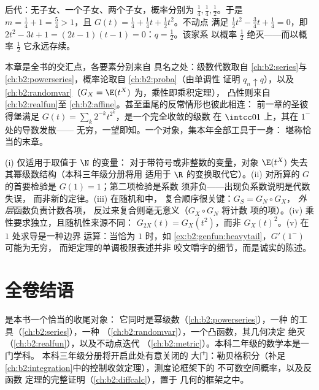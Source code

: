 \begin{example}\label{ex:b2:genfun:branchingexample}
后代：无子女、一个子女、两个子女，概率分别为
$\frac14, \frac14, \frac12$。于是 $m = \frac14 + 1 =
\frac54 > 1$，且 $G(t) = \frac14 + \frac14 t + \frac12 t^2$。不动点
满足 $\frac12 t^2 - \frac34 t + \frac14 = 0$，即\ $2t^2 - 3t
+ 1 = (2t - 1)(t - 1) = 0$：$q = \frac12$。该家系
以概率 $\frac12$ 绝灭——而以概率 $\frac12$
它永远存续。
\end{example}

\begin{remark}[本卷中的视角]
本章是全书的交汇点，各要素分别来自
具名之处：级数代数取自
\cref{ch:b2:series}与\cref{ch:b2:powerseries}，概率论取自
\cref{ch:b2:proba}（由单调性
证明 $q_n \uparrow q$），以及\cref{ch:b2:randomvar}（$G_X =
\E(t^X)$ 为，乘性即乘积定理），
凸性则来自\cref{ch:b2:realfun}至
\cref{ch:b2:affine}。甚至重尾的反常情形也彼此相连：
前一章的圣彼得堡满足
$G(t) = \sum_k2^{-k}t^{2^k}$，是一个完全收敛的级数
在 $\intcc01$ 上，其在 $1^-$ 处的导数发散——
无穷，一望即知。一个对象，集本年全部工具于一身：
堪称恰当的末章。
\end{remark}

\begin{remark}[常见误区]
(i) 仅适用于取值于 $\N$ 的变量：
对于带符号或非整数的变量，对象 $\E(t^X)$
失去其幂级数结构（本科三年级分册将用
适用于 $\R$ 的变换取代它）。(ii) 对所算的 $G$ 的首要检验是
$G(1) = 1$；第二项检验是系数
须非负——出现负系数说明是代数失误，
而非新的定律。(iii) 在随机和中，
复合顺序很关键：$G_S = G_N \circ G_X$，
\emph{外层}函数负责计数各项，
反过来复合则毫无意义（$G_X \circ G_N$ 将计数
项的项）。(iv) 乘性要求独立，且随机性来源不同：
$G_{2X}(t) = G_X(t^2)$，而非
$G_X(t)^2$。(v) 在 $1$ 处求导是一种边界
运算：当恰为 $1$ 时，如
\cref{ex:b2:genfun:heavytail}，$G'(1^-)$ 可能为无穷，
而矩定理的单调极限表述并非
咬文嚼字的细节，而是诚实的陈述。
\end{remark}

\section*{全卷结语}

是本书一个恰当的收尾对象：
它同时是幂级数（\cref{ch:b2:powerseries}），一种
的工具（\cref{ch:b2:series}），一种
（\cref{ch:b2:randomvar}），一个凸函数，其几何决定
绝灭（\cref{ch:b2:realfun}），以及不动点迭代
（\cref{ch:b2:metric}）。本科二年级的数学本是一门学科。
本科三年级分册将开启此处有意关闭的
大门：勒贝格积分（补足
\cref{ch:b2:integration}中的控制收敛定理），测度论框架下的
不可数空间概率，以及反函数
定理的完整证明（\cref{ch:b2:diffcalc}），置于
几何的框架之中。


